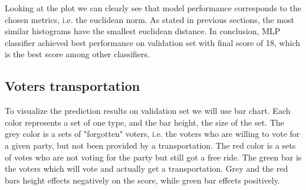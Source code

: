 \documentclass[12pt]{article}
\begin{document}
Looking at the plot we can clearly see that model performance corresponds to the chosen metrics, i.e. the euclidean norm. As stated in previous sections, the most similar histograms have the smallest euclidean distance. In conclusion, MLP classifier achieved best performance on validation set with final score of 18, which is the best score among other classifiers. 

\newpage
\subsection{Voters transportation}
To visualize the prediction results on validation set we will use bar chart. Each color represents a set of one type, and the bar height, the size of the set. The grey color is a sets of "forgotten" voters, i.e. the voters who are willing to vote for a given party, but not been provided by a transportation. The red color is a sets of votes who are not voting for the party but still got a free ride. The green bar is the voters which will vote and actually get a transportation. Grey and the red bars height effects negatively on the score, while green bar effects positively.    
\end{document}
